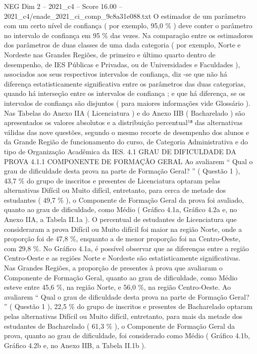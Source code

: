 \begin{textsample}{NEG Dim 2 – 2021\_c4 – Score 16.00 – 2021\_c4/enade\_2021\_ci\_comp\_9c8a31e088.txt}
O estimador de um parâmetro com um certo nível de confiança ( por exemplo, 95,0 \% ) deve conter o parâmetro no intervalo de confiança em 95 \% das vezes.
Na comparação entre os estimadores dos parâmetros de duas classes de uma dada categoria ( por exemplo, Norte e Nordeste nas Grandes Regiões, de primeiro e último quarto dentro de desempenho, de IES Públicas e Privadas, ou de Universidades e Faculdades ), associados aos seus respectivos intervalos de confiança, diz -se que não há diferença estatisticamente significativa entre os parâmetros das duas categorias, quando há interseção entre os intervalos de confiança ; e que há diferença, se os intervalos de confiança são disjuntos ( para maiores informações vide Glossário ).
Nas Tabelas do Anexo IIA ( Licenciatura ) e do Anexo IIB ( Bacharelado ) são apresentados os valores absolutos e a distribuição percentual¹⁸ das alternativas válidas das nove questões, segundo o mesmo recorte de desempenho dos alunos e da Grande Região de funcionamento do curso, de Categoria Administrativa e do tipo de Organização Acadêmica da IES. 4.1 GRAU DE DIFICULDADE DA PROVA 4.1.1 COMPONENTE DE FORMAÇÃO GERAL Ao avaliarem “ Qual o grau de dificuldade desta prova na parte de Formação Geral? ” ( Questão 1 ), 43,7 \% do grupo de inscritos e presentes de Licenciatura optaram pelas alternativas Difícil ou Muito difícil, entretanto, para cerca de metade dos estudantes ( 49,7 \% ), o Componente de Formação Geral da prova foi avaliado, quanto ao grau de dificuldade, como Médio ( Gráfico 4.1a, Gráfico 4.2a e, no Anexo IIA, a Tabela II.1a ).
O percentual de estudantes de Licenciatura que consideraram a prova Difícil ou Muito difícil foi maior na região Norte, onde a proporção foi de 47,8 \%, enquanto a de menor proporção foi na Centro-Oeste, com 29,8 \%.
No Gráfico 4.1a, é possível observar que as diferenças entre a região Centro-Oeste e as regiões Norte e Nordeste são estatisticamente significativas.
Nas Grandes Regiões, a proporção de presentes à prova que avaliaram o Componente de Formação Geral, quanto ao grau de dificuldade, como Médio esteve entre 45,6 \%, na região Norte, e 56,0 \%, na região Centro-Oeste.
Ao avaliarem “ Qual o grau de dificuldade desta prova na parte de Formação Geral? ” ( Questão 1 ), 22,5 \% do grupo de inscritos e presentes de Bacharelado optaram pelas alternativas Difícil ou Muito difícil, entretanto, para mais da metade dos estudantes de Bacharelado ( 61,3 \% ), o Componente de Formação Geral da prova, quanto ao grau de dificuldade, foi considerado como Médio ( Gráfico 4.1b, Gráfico 4.2b e, no Anexo IIB, a Tabela II.1b ).

\end{textsample}

